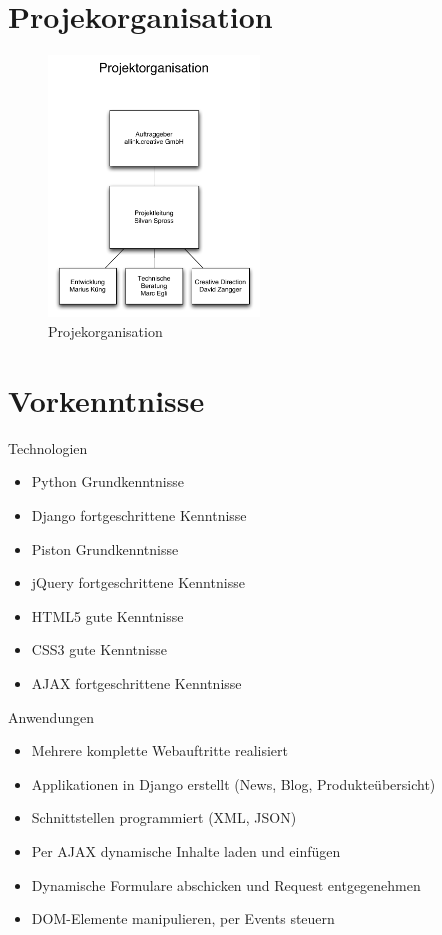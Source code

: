 \section{Projekorganisation}

\begin{figure}[!ht]
\begin{center}
\includegraphics[width=0.5\textwidth,angle=0]{./bilder/01_projektorganisation.pdf}
\caption[Projekorganisation]{Projekorganisation\footnotemark}
\end{center}
\end{figure}

\section{Vorkenntnisse}

Technologien
\begin{itemize}
    \item Python Grundkenntnisse
    \item Django fortgeschrittene Kenntnisse
    \item Piston Grundkenntnisse
    \item jQuery fortgeschrittene Kenntnisse
    \item HTML5 gute Kenntnisse
    \item CSS3 gute Kenntnisse
    \item AJAX fortgeschrittene Kenntnisse\\
\end{itemize}

Anwendungen
\begin{itemize}
    \item Mehrere komplette Webauftritte realisiert
    \item Applikationen in Django erstellt (News, Blog, Produkteübersicht)
    \item Schnittstellen programmiert (XML, JSON)
    \item Per AJAX dynamische Inhalte laden und einfügen
    \item Dynamische Formulare abschicken und Request entgegenehmen
    \item DOM-Elemente manipulieren, per Events steuern
\end{itemize}
    
